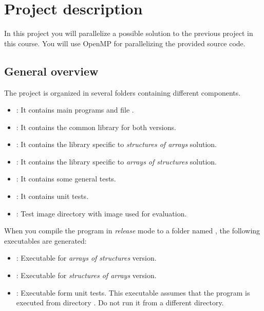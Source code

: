\section{Project description}

In this project you will parallelize a possible solution to the previous project
in this course. You will use OpenMP for parallelizing the provided source code.

\subsection{General overview}

The project is organized in several folders containing different components.

\begin{itemize}
  \item {}: It contains main programs and file
        .
  \item {}: It contains the common library for both versions.
  \item {}: It contains the library specific to 
        \emph{structures of arrays} solution.
  \item {}: It contains the library specific to 
        \emph{arrays of structures} solution.
  \item {}: It contains some general tests.
  \item {}: It contains unit tests.
  \item {}: Test image directory with image used for evaluation.
\end{itemize}

When you compile the program in \emph{release} mode to a folder named ,
the following executables are generated:

\begin{itemize}
  \item {}: Executable for \emph{arrays of structures} version.
  \item {}: Executable for \emph{structures of arrays} version.
  \item {}: Executable form unit tests.
        This executable assumes that the program is executed from directory .
        Do not run it from a different directory.
\end{itemize}
